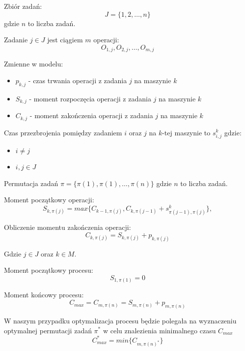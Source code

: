 Zbiór zadań:
\begin{equation}
	J=\lbrace 1,2,\dots,n \rbrace
\end{equation}
gdzie $n$ to liczba zadań.


Zadanie $j \in J$ jest ciągiem $m$ operacji:
\begin{equation}
	O_{1,j},O_{2,j},\dots,O_{m,j}
\end{equation}

Zmienne w modelu:
\begin{itemize}
	\item $p_{k,j}$ - czas trwania operacji z zadania $j$ na maszynie $k$
	\item $S_{k,j}$ - moment rozpoczęcia operacji z zadania $j$ na maszynie $k$
	\item $C_{k,j}$ - moment zakończenia operacji z zadania $j$ na maszynie $k$
\end{itemize}

Czas przezbrojenia pomiędzy zadaniem $i$ oraz $j$ na $k$-tej maszynie to $s_{i,j}^{k}$ gdzie:
\begin{itemize}
	\item $i \neq j$
	\item  $i,j \in J$
\end{itemize}

Permutacja zadań $\pi = \lbrace \pi(1),\pi(1),\dots,\pi(n) \rbrace$ gdzie $n$ to liczba zadań.

Moment początkowy operacji:
\begin{equation}
	S_{k,\pi(j)}=max\{C_{k-1,\pi(j)},C_{k,\pi(j-1)}+s^k_{\pi(j-1),\pi(j)}\},
\end{equation}

Obliczenie momentu zakończenia operacji:
\begin{equation}
	C_{k,\pi(j)} = S_{k,\pi(j)} + p_{k,\pi(j)}
\end{equation}

Gdzie $ j \in J$ oraz $k \in M$.

Moment początkowy procesu:
\begin{equation}
	S_{1,\pi(1)}=0
\end{equation}

Moment końcowy procesu:
\begin{equation}
	C_{max} = 	C_{m,\pi(n)} = S_{m,\pi(n)} + p_{m,\pi(n)}
\end{equation}

W naszym przypadku optymalizacja procesu będzie polegała na wyznaczeniu optymalnej permutacji zadań $\pi^*$
w celu znalezienia minimalnego czasu $C_{max}$
\begin{equation}
	C_{max}^{*} = min\{C_{m,\pi(n)^{*}}\}
\end{equation}

